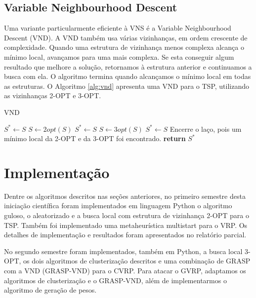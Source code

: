 \documentclass[12pt, a4paper]{article}
\begin{document}
\subsection{Variable Neighbourhood Descent}

Uma variante particularmente eficiente à VNS é a Variable Neighbourhood Descent (VND). A VND também usa várias vizinhanças, em ordem crescente de complexidade. Quando uma estrutura de vizinhança menos complexa alcança o mínimo local, avançamos para uma mais complexa. Se esta conseguir algum resultado que melhore a solução, retornamos à estrutura anterior e continuamos a busca com ela. O algoritmo termina quando alcançamos o mínimo local em todas as estruturas. O Algoritmo \ref{alg:vnd} apresenta uma VND para o TSP, utilizando as vizinhanças 2-OPT e 3-OPT.
%
\begin{algorithm}[htb!]
  \caption{VND}\label{alg:vnd}
  \begin{algorithmic}[1]
	\State $S^* \gets S$
    		\State $S \gets 2opt(S)$
			\State $S^* \gets S$
		\Else
			\State $S \gets 3opt(S)$
				\State $S^* \gets S$
			\Else
				\State Encerre o laço, pois um mínimo local da 2-OPT e da 3-OPT foi encontrado.
    			\EndIf
		\EndIf
      	\EndWhile
      \State \textbf{return} $S^*$
      \EndFunction
  \end{algorithmic}
\end{algorithm}


\section{Implementação}\label{sec:implementation}

Dentre os algoritmos descritos nas seções anteriores, no primeiro semestre desta iniciação científica foram implementados em linguagem Python o algoritmo guloso, o aleatorizado e a busca local com estrutura de vizinhança 2-OPT para o TSP. Também foi implementado uma metaheurística multistart para o VRP. Os detalhes de implementação e resultados foram apresentados no relatório parcial.

No segundo semestre foram implementados, também em Python, a busca local 3-OPT, os dois algoritmos de clusterização descritos e uma combinação de GRASP com a VND (GRASP-VND) para o CVRP. Para atacar o GVRP, adaptamos os algoritmos de clusterização e o GRASP-VND, além de implementarmos o algoritmo de geração de pesos.
\end{document}
